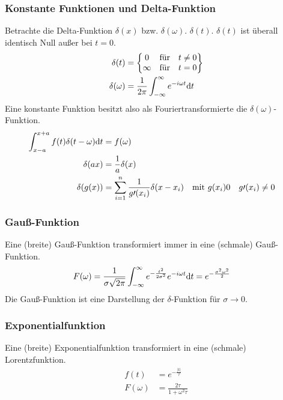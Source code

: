 \subsubsection{Konstante Funktionen und Delta-Funktion}
Betrachte die Delta-Funktion $\delta(x)$ bzw. $\delta(\omega)$.
$\delta(t)$. $\delta(t)$ ist überall identisch Null außer bei $t=0$. 
\begin{align*}
  \delta(t) &= \begin{Bmatrix}
    0 &\text{für} &t\neq 0\\
    \infty &\text{für} &t=0
  \end{Bmatrix}\\
  \delta(\omega) &= \frac{1}{2\pi}\int_{-\infty}^{\infty}
                   e^{-i\omega t}\mathrm{d} t
\end{align*}
Eine konstante Funktion besitzt also als Fouriertransformierte die
$\delta(\omega)$-Funktion.
\begin{align*}
  \int_{x-a}^{x+a} f(t)\delta(t-\omega)\mathrm{d} t
  &= f(\omega)\\
  \delta(ax) &= \frac{1}{a}\delta(x)\\
  \delta(g(x)) &= \sum_{i=1}^{n}\frac{1}{g\prime (x_i)}\delta(x-x_i)
             &\text{mit } g(x_i)&0&g\prime(x_i)&\neq 0
\end{align*}


\subsubsection{Gauß-Funktion} 
Eine (breite) Gauß-Funktion transformiert
immer in eine (schmale) Gauß-Funktion.
\begin{align*}
  F(\omega) &= \frac{1}{\sigma\sqrt{2\pi}}\int_{-\infty}^{\infty}
              e^{-\frac{t^2}{2\sigma^2}} e^{-i\omega t} \mathrm{d} t
              = e^{-\frac{\sigma^2\omega^2}{2}}
\end{align*}
Die Gauß-Funktion ist eine Darstellung der $\delta$-Funktion für
$\sigma\longrightarrow 0$.


\subsubsection{Exponentialfunktion} 
Eine (breite) Exponentialfunktion
transformiert in eine (schmale) Lorentzfunktion.
\begin{align*}
  f(t) &= e^{-\frac{\vert t\vert}{\tau}}\\
  F(\omega) &= \frac{2\tau}{1+\omega^2\tau}
\end{align*}


